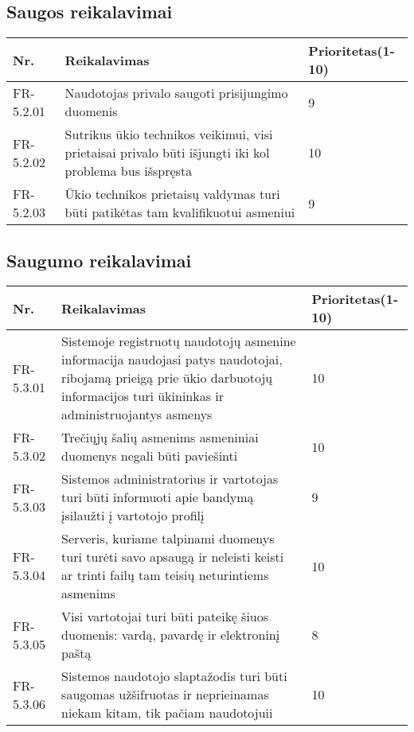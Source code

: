 \documentclass[oneside]{VUMIFPSkursinis}
\begin{document}
\subsection{Saugos reikalavimai}
\begin{table}[htbp]
	\begin{tabularx}{1\textwidth}{ |P{2.5cm}|X|P{3cm }| }  \hline
		Nr. & Reikalavimas & Prioritetas(1-10) \\ \hline
		FR-5.2.01 & Naudotojas privalo saugoti prisijungimo duomenis & 9 \\ \hline
		FR-5.2.02 & Sutrikus ūkio technikos veikimui, visi prietaisai privalo būti išjungti iki kol problema bus išspręsta & 10 \\ \hline
		FR-5.2.03 & Ūkio technikos prietaisų valdymas turi būti patikėtas tam kvalifikuotui asmeniui & 9 \\ \hline
	\end{tabularx}
\end{table}
\subsection{Saugumo reikalavimai}
\begin{table}[htbp]
	\begin{tabularx}{1\textwidth}{ |P{2.5cm}|X|P{3cm }| }  \hline
		Nr. & Reikalavimas & Prioritetas(1-10) \\ \hline
		FR-5.3.01 & Sistemoje registruotų naudotojų asmenine informacija naudojasi patys naudotojai, ribojamą prieigą prie ūkio darbuotojų informacijos turi ūkininkas ir administruojantys asmenys & 10 \\ \hline
		FR-5.3.02 & Trečiųjų šalių asmenims asmeniniai duomenys negali būti paviešinti & 10 \\ \hline
		FR-5.3.03 & Sistemos administratorius ir vartotojas turi būti informuoti apie bandymą įsilaužti į vartotojo profilį & 9 \\ \hline
		FR-5.3.04 & Serveris, kuriame talpinami duomenys turi turėti savo apsaugą ir neleisti keisti ar trinti failų tam teisių neturintiems asmenims & 10 \\ \hline
		FR-5.3.05 & Visi vartotojai turi būti pateikę šiuos duomenis: vardą, pavardę ir elektroninį paštą  & 8 \\ \hline
		FR-5.3.06 & Sistemos naudotojo slaptažodis turi būti saugomas užšifruotas ir neprieinamas niekam kitam, tik pačiam naudotojuii & 10 \\ \hline
	\end{tabularx}
\end{table}
\end{document}

